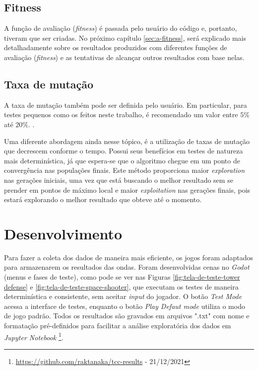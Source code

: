 \subsection{Fitness}

A função de avaliação (\textit{fitness}) é passada pelo usuário do código e, portanto, tiveram que ser criadas. No próximo capítulo \ref{sec:a-fitness}, será explicado mais detalhadamente sobre os resultados produzidos com diferentes funções de avaliação (\textit{fitness}) e as tentativas de alcançar outros resultados com base nelas.

\subsection{Taxa de mutação}

A taxa de mutação também pode ser definida pelo  usuário. Em particular, para testes pequenos como os feitos neste trabalho, é recomendado um valor entre $5\%$ até $20\%$. \citep{haupt00:mutationprob}.

Uma diferente abordagem ainda nesse tópico, é a utilização de taxas de mutação que decrescem conforme o tempo. Possui seus benefícios em testes de natureza mais determinística, já que espera-se que o algoritmo chegue em um ponto de convergência nas populações finais. Este método proporciona maior \textit{exploration} nas gerações iniciais, uma vez que está buscando o melhor resultado sem se prender em pontos de máximo local e maior \textit{exploitation} nas gerações finais, pois estará explorando o melhor resultado que obteve até o momento. \citep{eiben98:exploitvsexplore}

\section{Desenvolvimento}
\label{sec:t-desenvolvimento}

Para fazer a coleta dos dados de maneira mais eficiente, os jogos foram adaptados para armazenarem os resultados das ondas. Foram desenvolvidas cenas no \textit{Godot} (menus e fases de teste), como pode se ver nas Figuras \ref{fig:tela-de-teste-tower defense} e \ref{fig:tela-de-teste-space-shooter}, que executam os testes de maneira determinística e consistente, sem aceitar \textit{input} do jogador. O botão \textit{Test Mode} acessa a interface de testes, enquanto o botão \textit{Play Defaut mode} utiliza o modo de jogo padrão. Todos os resultados são gravados em arquivos ".txt" com nome e formatação pré-definidos para facilitar a análise exploratória dos dados em \textit{Jupyter Notebook} \footnote{ \url{https://github.com/raktanaka/tcc-results} - 21/12/2021}.

